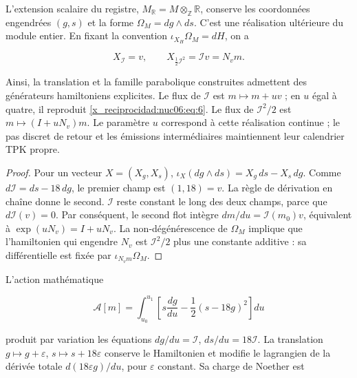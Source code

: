 \begin{theorem}
\label{x_reciprocidad:nuc06:variacional}

L’extension scalaire du registre, \(M_{\mathbb R}=M\otimes_{\mathbb Z}\mathbb R\), conserve les coordonnées engendrées \((g,s)\) et la forme \(\Omega_M=dg\wedge ds\). C’est une réalisation ultérieure du module entier. En fixant la convention \(\iota_{X_H}\Omega_M=dH\), on a

\begin{equation}
X_{\mathcal I}=v,\qquad
X_{\frac12\mathcal I^2}=\mathcal I v=N_vm.
\label{x_reciprocidad:nuc06:eq:12a}
\end{equation}

Ainsi, la translation et la famille parabolique construites admettent des générateurs hamiltoniens explicites. Le flux de \(\mathcal I\) est \(m\mapsto m+uv\) ; en \(u\) égal à quatre, il reproduit \eqref{x_reciprocidad:nuc06:eq:6}. Le flux de \(\mathcal I^2/2\) est \(m\mapsto(I+uN_v)m\). Le paramètre \(u\) correspond à cette réalisation continue ; le pas discret de retour et les émissions intermédiaires maintiennent leur calendrier TPK propre.
\end{theorem}

\begin{proof}
Pour un vecteur \(X=(X_g,X_s)\), \(\iota_X(dg\wedge ds)=X_g\,ds-X_s\,dg\). Comme \(d\mathcal I=ds-18\,dg\), le premier champ est \((1,18)=v\). La règle de dérivation en chaîne donne le second. \(\mathcal I\) reste constant le long des deux champs, parce que \(d\mathcal I(v)=0\). Par conséquent, le second flot intègre \(dm/du=\mathcal I(m_0)v\), équivalent à \(\exp(uN_v)=I+uN_v\). La non-dégénérescence de \(\Omega_M\) implique que l’hamiltonien qui engendre \(N_v\) est \(\mathcal I^2/2\) plus une constante additive : sa différentielle est fixée par \(\iota_{N_vm}\Omega_M\).
\end{proof}

L’action mathématique

\begin{equation}
\mathscr A[m]=\int_{u_0}^{u_1}
\left[s\frac{dg}{du}-\frac12(s-18g)^2\right]du
\label{x_reciprocidad:nuc06:eq:12b}
\end{equation}

produit par variation les équations \(dg/du=\mathcal I\), \(ds/du=18\mathcal I\). La translation \(g\mapsto g+\varepsilon\), \(s\mapsto s+18\varepsilon\) conserve le Hamiltonien et modifie le lagrangien de la dérivée totale \(d(18\varepsilon g)/du\), pour \(\varepsilon\) constant. Sa charge de Noether est

